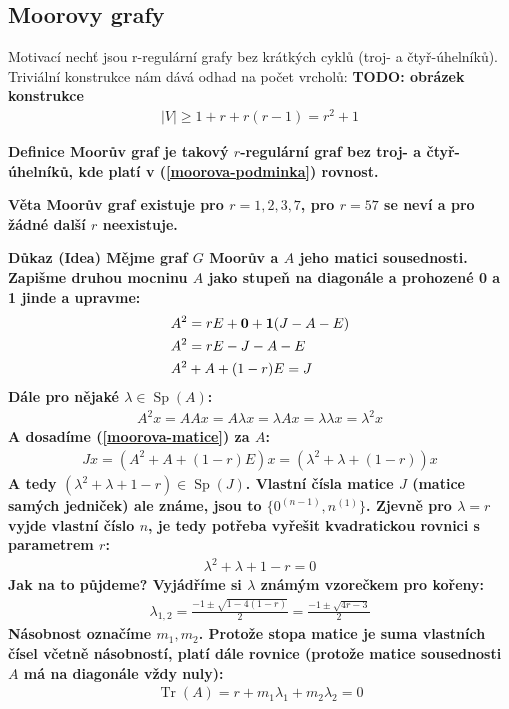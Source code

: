 \documentclass[a4paper,12pt,titlepage]{article}
\newcommand{\dk}{\smallskip\noindent\bf Důkaz\rm{} }
\newcommand{\df}{\smallskip\noindent\bf Definice\rm{} }
\newcommand{\vt}{\smallskip\noindent\bf Věta\rm{} }
\newcommand{\todo}[1]{\bf TODO: \rm#1}
\DeclareMathOperator{\Sp}{Sp}
\DeclareMathOperator{\Tr}{Tr}
\begin{document}
\subsection{Moorovy grafy}
Motivací nechť jsou r-regulární grafy bez krátkých cyklů (troj- a 
čtyř-úhelníků). Triviální konstrukce nám dává odhad na počet vrcholů:
\todo{obrázek konstrukce}
\begin{align}
\label{moorova-podminka}
	|V| \geq 1 + r + r(r-1) = r^2 +1
\end{align}

\df Moorův graf je takový $r$-regulární graf bez troj- a čtyř-úhelníků, kde 
platí v (\ref{moorova-podminka}) rovnost.

\vt Moorův graf existuje pro $r=1,2,3,7$, pro $r=57$ se neví a pro žádné další 
$r$ neexistuje.

\dk (Idea) Mějme graf $G$ Moorův a $A$ jeho matici sousednosti. Zapišme druhou 
mocninu $A$ jako stupeň na diagonále a prohozené 0 a 1 jinde a upravme:
\begin{align}
	&A^2 = rE + {\bf0} + {\bf1}(J- A-E) \\
	&A^2 = rE - J - A - E \\
	\label{moorova-matice}&A^2 + A + (1-r)E = J
\end{align}
Dále pro nějaké $\lambda\in \Sp(A)$:
\begin{align}
	\label{moorova-mocnina}A^2 x = AAx = A\lambda x = \lambda A x = \lambda 
	\lambda x = \lambda^2 x
\end{align}
A dosadíme (\ref{moorova-matice}) za $A$:
\begin{align}
	Jx = (A^2 + A + (1-r)E)x = (\lambda^2 + \lambda + (1-r))x
\end{align}
A tedy $(\lambda^2 + \lambda + 1 -r) \in \Sp(J)$. Vlastní čísla matice $J$ 
(matice samých jedniček) ale známe, jsou to $\{0^{(n-1)}, n^{(1)}\}$. Zjevně pro 
$\lambda = r$ vyjde vlastní číslo $n$, je tedy potřeba vyřešit kvadratickou 
rovnici s parametrem $r$:
\begin{align}
	\lambda^2 + \lambda + 1 - r = 0
\end{align}
Jak na to půjdeme? Vyjádříme si $\lambda$ známým vzorečkem pro kořeny:
\begin{align}
	\lambda_{1,2} = \frac{-1\pm \sqrt{1-4(1-r)}}{2} = \frac{-1\pm\sqrt{4r-3}}{2}
\end{align}
Násobnost označíme $m_1, m_2$. Protože stopa matice je suma vlastních čísel 
včetně násobností, platí dále rovnice (protože matice sousednosti $A$ má na 
diagonále vždy nuly):
\begin{align}
	\Tr(A) = r+m_1\lambda_1 + m_2\lambda_2 = 0
\end{align}
\end{document}
